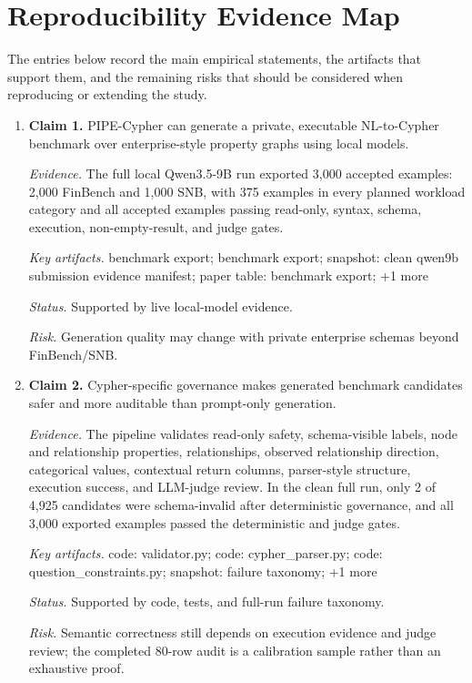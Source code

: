 \section{Reproducibility Evidence Map}
\label{tab:claim_evidence_map}
The entries below record the main empirical statements, the artifacts that support them, and the remaining risks that should be considered when reproducing or extending the study.
\begin{enumerate}
\item \textbf{Claim 1.} PIPE-Cypher can generate a private, executable NL-to-Cypher benchmark over enterprise-style property graphs using local models.\par
\textit{Evidence.} The full local Qwen3.5-9B run exported 3,000 accepted examples: 2,000 FinBench and 1,000 SNB, with 375 examples in every planned workload category and all accepted examples passing read-only, syntax, schema, execution, non-empty-result, and judge gates.\par
\textit{Key artifacts.} benchmark export; benchmark export; snapshot: clean qwen9b submission evidence manifest; paper table: benchmark export; +1 more\par
\textit{Status.} Supported by live local-model evidence.\par
\textit{Risk.} Generation quality may change with private enterprise schemas beyond FinBench/SNB.
\item \textbf{Claim 2.} Cypher-specific governance makes generated benchmark candidates safer and more auditable than prompt-only generation.\par
\textit{Evidence.} The pipeline validates read-only safety, schema-visible labels, node and relationship properties, relationships, observed relationship direction, categorical values, contextual return columns, parser-style structure, execution success, and LLM-judge review. In the clean full run, only 2 of 4,925 candidates were schema-invalid after deterministic governance, and all 3,000 exported examples passed the deterministic and judge gates.\par
\textit{Key artifacts.} code: validator.py; code: cypher\_parser.py; code: question\_constraints.py; snapshot: failure taxonomy; +1 more\par
\textit{Status.} Supported by code, tests, and full-run failure taxonomy.\par
\textit{Risk.} Semantic correctness still depends on execution evidence and judge review; the completed 80-row audit is a calibration sample rather than an exhaustive proof.

\end{enumerate}
